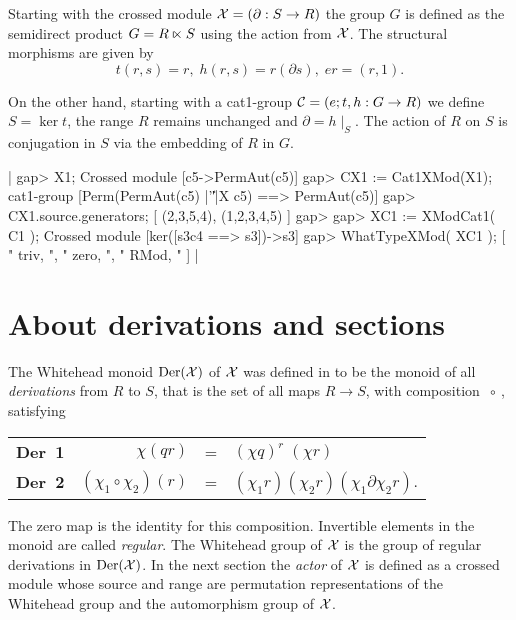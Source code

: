 Starting with the crossed module 
${\cal X} = (\partial \: S \to R)$ the group $ G $ is defined 
as the semidirect product $ G = R \semidirect S$
using the action from  ${\cal X}$.
The structural morphisms are given by
$$
t(r,s) = r, \; h(r,s) = r (\partial s), \; er = (r,1).
$$

On the other hand, starting with a cat1-group 
$ {\cal C} = (e;t,h \: G \to R)$  we define 
$ S = \ker t$, the range $R$ remains unchanged and 
$ \partial = h\mid_S $.
The action of  $R$  on  $S$  is conjugation in  $S$  via the embedding
of  $R$  in  $G$.

|    gap> X1;
    Crossed module [c5->PermAut(c5)]
    gap> CX1 := Cat1XMod(X1);
    cat1-group [Perm(PermAut(c5) |'\|'|X c5) ==> PermAut(c5)] 
    gap> CX1.source.generators;
    [ (2,3,5,4), (1,2,3,4,5) ]
    gap>
    gap> XC1 := XModCat1( C1 );
    Crossed module [ker([s3c4 ==> s3])->s3]
    gap> WhatTypeXMod( XC1 );
    [ " triv, ", " zero, ", " RMod, " ]  |



\section{About derivations and sections}%

The Whitehead monoid  $\rm{Der}({\cal X})$  of  ${\cal X}$ 
was defined in \cite{W2} 
to be the monoid of all {\it derivations}
from $ R $ to $S$, that is the set of all maps  $R \to S$,
with composition  $\ \circ \ $, satisfying
\begin{center}
\begin{tabular}{c r c l }
\textbf{Der\ 1\:}  &  $\chi(qr)$              &  = 
           & $(\chi q)^{r} \; (\chi r)$  \\
\textbf{Der\ 2\:}  &  $(\chi_1 \circ \chi_2)(r)$  &  =
           & $(\chi_1 r)(\chi_2 r)(\chi_1 \partial \chi_2 r)$. 
\end{tabular}
\end{center}

\noindent
The zero map is the identity for this composition.
Invertible elements in the monoid are called {\em regular}.
The Whitehead group of ${\cal X}$ 
is the group of regular derivations in $\rm{Der}({\cal X} )$. 
In the next section the {\em actor} of ${\cal X}$ 
is defined as a crossed module whose source and range are permutation 
representations of the Whitehead group and the automorphism group of 
${\cal X}$.

